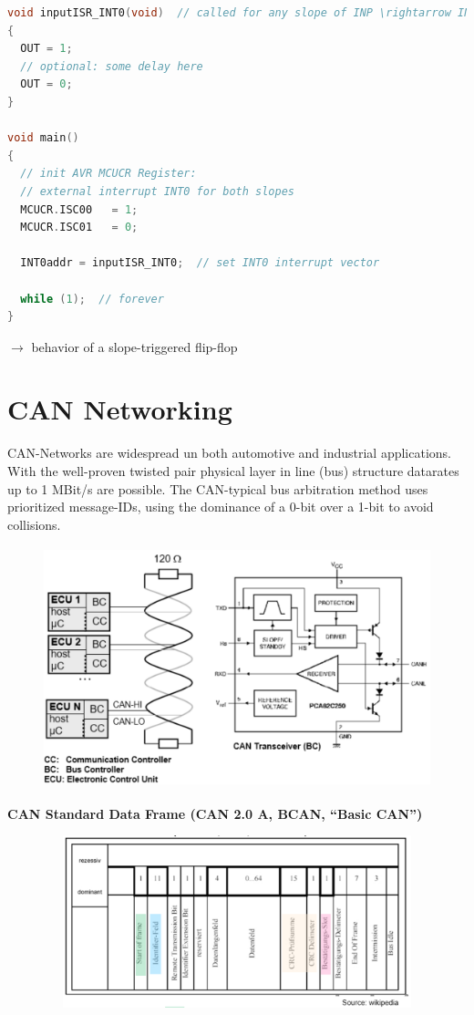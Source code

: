 \begin{lstlisting}[style=mystyle, language=c]
void inputISR_INT0(void)  // called for any slope of INP \rightarrow INT0
{
  OUT = 1;
  // optional: some delay here 
  OUT = 0;
}

void main()
{
  // init AVR MCUCR Register:
  // external interrupt INT0 for both slopes
  MCUCR.ISC00	= 1;  
  MCUCR.ISC01	= 0;  

  INT0addr = inputISR_INT0;  // set INT0 interrupt vector

  while (1);  // forever
}
\end{lstlisting}

$\rightarrow$ behavior of a slope-triggered flip-flop

\section{CAN Networking}

CAN-Networks are widespread un both automotive and industrial applications. With the well-proven twisted pair physical layer in line (bus) structure datarates up to 1 MBit/s are possible. The CAN-typical bus arbitration method uses prioritized message-IDs, using the dominance of a 0-bit over a 1-bit to avoid collisions.

    \begin{figure}[h]
    \centering
    \includegraphics[width=14cm, height=7cm]{Images/image53.png}
    \label{fig:Fig 150}
    \end{figure}

\textbf{CAN Standard Data Frame (CAN 2.0 A, BCAN, ``Basic CAN'')}

    \begin{figure}[h]
    \centering
    \includegraphics[width=15cm, height=5cm]{Images/image54.png}
    \label{fig:Fig 151}
    \end{figure}

